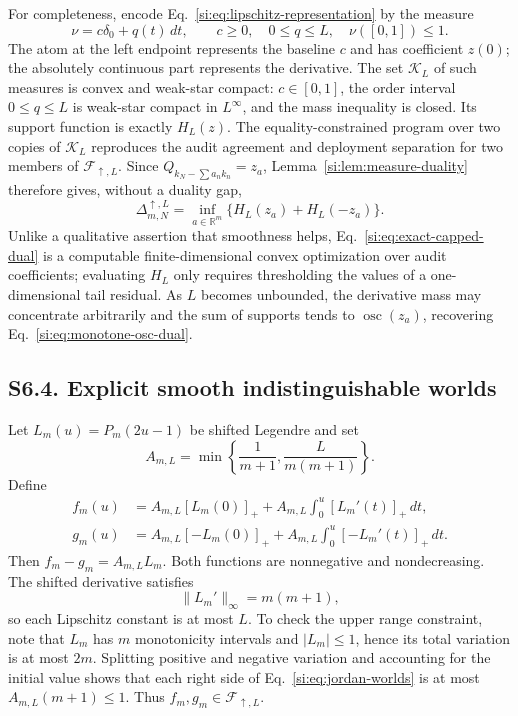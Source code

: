 \documentclass[10pt,twocolumn]{article}
\newcommand{\cF}{\mathcal F}
\begin{document}
For completeness, encode Eq.~\ref{si:eq:lipschitz-representation} by the
measure
\begin{equation}
\nu=c\delta_0+q(t)\,dt,\qquad
c\ge0,\quad0\le q\le L,\quad \nu([0,1])\le1.
\label{si:eq:capped-measure-set}
\end{equation}
The atom at the left endpoint represents the baseline $c$ and has coefficient
$z(0)$; the absolutely continuous part represents the derivative. The set
$\mathcal K_L$ of such measures is convex and weak-star compact: $c\in[0,1]$,
the order interval $0\le q\le L$ is weak-star compact in $L^\infty$, and the
mass inequality is closed. Its support function is exactly $H_L(z)$. The
equality-constrained program over two copies of $\mathcal K_L$ reproduces the
audit agreement and deployment separation for two members of
$\cF_{\uparrow,L}$. Since $Q_{k_N-\sum a_nk_n}=z_a$,
Lemma~\ref{si:lem:measure-duality} therefore gives, without a duality gap,
\begin{equation}
\boxed{\Delta^{\uparrow,L}_{m,N}
=\inf_{a\in\mathbb R^m}
\{H_L(z_a)+H_L(-z_a)\}.}
\label{si:eq:exact-capped-dual}
\end{equation}
Unlike a qualitative assertion that smoothness helps, Eq.~\ref{si:eq:exact-capped-dual} is a computable finite-dimensional convex optimization over audit coefficients; evaluating $H_L$ only requires thresholding the values of a one-dimensional tail residual. As $L$ becomes unbounded, the derivative mass may concentrate arbitrarily and the sum of supports tends to $\operatorname{osc}(z_a)$, recovering Eq.~\ref{si:eq:monotone-osc-dual}.

\subsection*{S6.4. Explicit smooth indistinguishable worlds}

Let $L_m(u)=P_m(2u-1)$ be shifted Legendre and set
\begin{equation}
A_{m,L}=\min\left\{\frac1{m+1},\frac{L}{m(m+1)}\right\}.
\label{si:eq:legendre-amplitude}
\end{equation}
Define
\begin{align}
f_m(u)&=A_{m,L}[L_m(0)]_+
+A_{m,L}\int_0^u[L_m'(t)]_+\,dt,\nonumber\\
g_m(u)&=A_{m,L}[-L_m(0)]_+
+A_{m,L}\int_0^u[-L_m'(t)]_+\,dt.
\label{si:eq:jordan-worlds}
\end{align}
Then $f_m-g_m=A_{m,L}L_m$. Both functions are nonnegative and nondecreasing. The shifted derivative satisfies
\begin{equation}
\|L_m'\|_\infty=m(m+1),
\label{si:eq:legendre-derivative}
\end{equation}
so each Lipschitz constant is at most $L$. To check the upper range constraint, note that $L_m$ has $m$ monotonicity intervals and $|L_m|\le1$, hence its total variation is at most $2m$. Splitting positive and negative variation and accounting for the initial value shows that each right side of Eq.~\ref{si:eq:jordan-worlds} is at most $A_{m,L}(m+1)\le1$. Thus $f_m,g_m\in\cF_{\uparrow,L}$.
\end{document}
